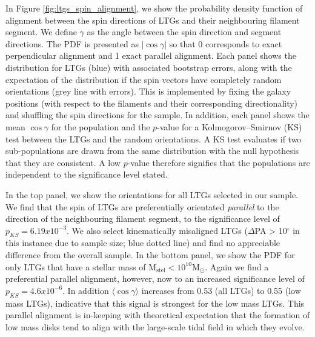 In Figure \ref{fig:ltgs_spin_alignment}, we show the probability density function of alignment between the spin directions of LTGs and their neighbouring filament segment. We define $\gamma$ as the angle between the spin direction and segment directions. The PDF is presented as $|\cos \gamma|$ so that 0 corresponds to exact perpendicular alignment and 1 exact parallel alignment. Each panel shows the distribution for LTGs (blue) with associated bootstrap errors, along with the expectation of the distribution if the spin vectors have completely random orientations (grey line with errors). This is implemented by fixing the galaxy positions (with respect to the filaments and their corresponding directionality) and shuffling the spin directions for the sample. In addition, each panel shows the mean $\cos \gamma$ for the population and the $p$-value for a Kolmogorov--Smirnov (KS) test between the LTGs and the random orientations. A KS test evaluates if two sub-populations are drawn from the same distribution with the null hypothesis that they are consistent. A low $p$-value therefore signifies that the populations are independent to the significance level stated. 

In the top panel, we show the orientations for all LTGs selected in our sample. We find that the spin of LTGs are preferentially orientated \textit{parallel} to the direction of the neighbouring filament segment, to the significance level of $p_{KS} = 6.19 x 10^{-3}$. We also select kinematically misaligned LTGs ($\Delta$PA > 10$^{\circ}$ in this instance due to sample size; blue dotted line) and find no appreciable difference from the overall sample. In the bottom panel, we show the PDF for only LTGs that have a stellar mass of $\mathrm{M_{stel} < 10^{10} M_{\odot}}$. Again we find a preferential parallel alignment, however, now to an increased significance level of $p_{KS} = 4.6 x 10^{-6}$. In addition $\langle \cos \gamma \rangle$ increases from 0.53 (all LTGs) to 0.55 (low mass LTGs), indicative that this signal is strongest for the low mass LTGs. This parallel alignment is in-keeping with theoretical expectation that the formation of low mass disks tend to align with the large-scale tidal field in which they evolve. 

